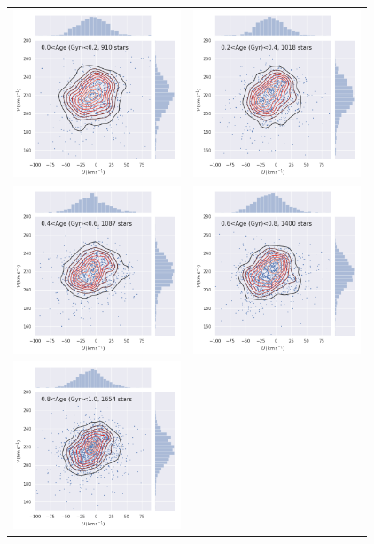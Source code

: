 \begin{figure}[htbp]
   \centering
\begin{tabular}{cc}
\includegraphics[width=5cm]{fig/UV/0to200Myr_z0.1kpc_hist2d.png}&
\includegraphics[width=5cm]{fig/UV/200to400Myr_z0.1kpc_hist2d.png}\\
\includegraphics[width=5cm]{fig/UV/400to600Myr_z0.1kpc_hist2d.png}&
\includegraphics[width=5cm]{fig/UV/600to800Myr_z0.1kpc_hist2d.png}\\
\includegraphics[width=5cm]{fig/UV/800to1000Myr_z0.1kpc_hist2d.png}&

\end{tabular}
\end{figure}
